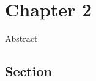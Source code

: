 \setlength{\headheight}{1.2cm}
\renewcommand{\publ}{\flushleft\footnotesize{Based on:\\[0.1cm]
		\textit{``Title''} \\[0.1cm]
}}

\chapter{Chapter 2}\label{chap:2}


\begin{Abstract}
Abstract
\end{Abstract}

\section{Section}
\label{sec:2.1}
